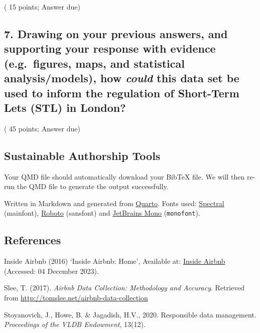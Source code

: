 \documentclass[
  a4paper,
  DIV=11,
  numbers=noendperiod]{scrartcl}
\begin{document}
( 15 points; Answer due)

\hypertarget{drawing-on-your-previous-answers-and-supporting-your-response-with-evidence-e.g.-figures-maps-and-statistical-analysismodels-how-could-this-data-set-be-used-to-inform-the-regulation-of-short-term-lets-stl-in-london}{%
\subsection{\texorpdfstring{7. Drawing on your previous answers, and
supporting your response with evidence (e.g.~figures, maps, and
statistical analysis/models), how \emph{could} this data set be used to
inform the regulation of Short-Term Lets (STL) in
London?}{7. Drawing on your previous answers, and supporting your response with evidence (e.g.~figures, maps, and statistical analysis/models), how could this data set be used to inform the regulation of Short-Term Lets (STL) in London?}}\label{drawing-on-your-previous-answers-and-supporting-your-response-with-evidence-e.g.-figures-maps-and-statistical-analysismodels-how-could-this-data-set-be-used-to-inform-the-regulation-of-short-term-lets-stl-in-london}}

( 45 points; Answer due)

\hypertarget{sustainable-authorship-tools}{%
\subsection{Sustainable Authorship
Tools}\label{sustainable-authorship-tools}}

Your QMD file should automatically download your BibTeX file. We will
then re-run the QMD file to generate the output successfully.

Written in Markdown and generated from
\href{https://quarto.org/}{Quarto}. Fonts used:
\href{https://fonts.google.com/specimen/Spectral}{Spectral} (mainfont),
\href{https://fonts.google.com/specimen/Roboto}{Roboto} ({sansfont}) and
\href{https://fonts.google.com/specimen/JetBrains\%20Mono}{JetBrains
Mono} (\texttt{monofont}).

\hypertarget{references}{%
\subsection{References}\label{references}}

Inside Airbnb (2016) `Inside Airbnb: Home', Available at:
\href{http://insideairbnb.com/}{Inside Airbnb} (Accessed: 04 December
2023).

Slee, T. (2017). \emph{Airbnb Data Collection: Methodology and
Accuracy}. Retrieved from
\url{http://tomslee.net/airbnb-data-collection}

Stoyanovich, J., Howe, B. \& Jagadish, H.V., 2020. Responsible data
management. \emph{Proceedings of the VLDB Endowment}, 13(12).
\end{document}
